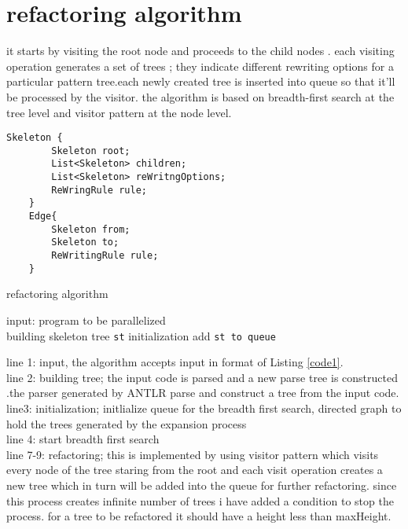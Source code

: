 \documentclass[12pt]{report}
\begin{document}
\section{refactoring algorithm}
it starts by visiting the root node and proceeds to the child nodes . each visiting operation generates a set of trees ; they indicate different rewriting options for a particular pattern tree.each newly created tree is inserted into queue so that it'll be processed by the visitor. the algorithm is based on breadth-first search at the tree level and visitor pattern at the node level. 

\begin{lstlisting}[caption={skeleton tree}, label={tree1}]
	Skeleton {
		Skeleton root;
		List<Skeleton> children;
		List<Skeleton> reWritngOptions;
		ReWringRule rule;
	}
	Edge{
		Skeleton from;
		Skeleton to;
		ReWritingRule rule;
	}
\end{lstlisting}
\begin{algorithm}[H]
\SetAlgoLined
 \caption {refactoring algorithm}\label{euclid}
  input: program to be parallelized\\
  building skeleton tree \texttt{st}\;
  initialization\;
  add \texttt{st to queue}\\

\end{algorithm}
line 1: input, the algorithm accepts input in format of  Listing \ref{code1}.\\
line 2: building tree; the input code is parsed and a new parse tree is constructed .the parser generated by ANTLR parse and construct a tree from the input code.\\
line3: initialization; initlialize queue for the breadth first search, directed graph to hold the trees generated by the expansion process\\
line 4: start breadth first search\\
line 7-9: refactoring; this is implemented by using visitor pattern which visits every node of the tree staring from the root and each visit operation creates a new tree which in turn will be added into the queue for further refactoring. since this process creates infinite number of trees i have added a condition to stop the process. for a tree to be refactored it should have a height less than maxHeight.
\end{document}
